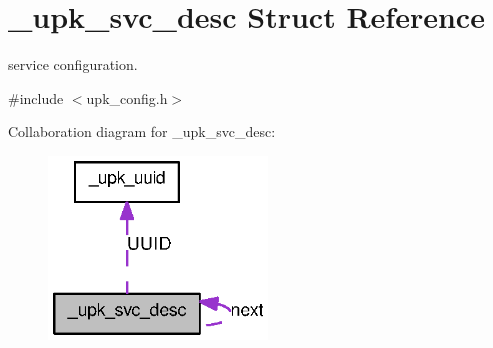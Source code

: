 \section{\_\-upk\_\-svc\_\-desc Struct Reference}
\label{struct__upk__svc__desc}


service configuration.  




{\ttfamily \#include $<$upk\_\-config.h$>$}



Collaboration diagram for \_\-upk\_\-svc\_\-desc:\nopagebreak
\begin{figure}[H]
\begin{center}
\leavevmode
\includegraphics[width=165pt]{struct__upk__svc__desc__coll__graph}
\end{center}
\end{figure}
